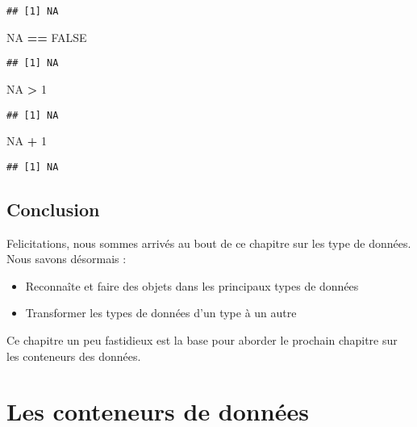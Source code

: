 \documentclass[]{book}
\newenvironment{Shaded}{\begin{snugshade}}{\end{snugshade}}
\newcommand{\DecValTok}[1]{\textcolor[rgb]{0.00,0.00,0.81}{#1}}
\newcommand{\StringTok}[1]{\textcolor[rgb]{0.31,0.60,0.02}{#1}}
\newcommand{\OtherTok}[1]{\textcolor[rgb]{0.56,0.35,0.01}{#1}}
\newcommand{\OperatorTok}[1]{\textcolor[rgb]{0.81,0.36,0.00}{\textbf{#1}}}
\providecommand{\tightlist}{%
  \setlength{\itemsep}{0pt}\setlength{\parskip}{0pt}}
\theoremstyle{definition}
\theoremstyle{definition}
\theoremstyle{definition}
\theoremstyle{remark}
\begin{document}
\begin{verbatim}
## [1] NA
\end{verbatim}

\begin{Shaded}
\begin{Highlighting}[]
\OtherTok{NA} \OperatorTok{==}\StringTok{ }\OtherTok{FALSE}
\end{Highlighting}
\end{Shaded}

\begin{verbatim}
## [1] NA
\end{verbatim}

\begin{Shaded}
\begin{Highlighting}[]
\OtherTok{NA} \OperatorTok{>}\StringTok{ }\DecValTok{1}
\end{Highlighting}
\end{Shaded}

\begin{verbatim}
## [1] NA
\end{verbatim}

\begin{Shaded}
\begin{Highlighting}[]
\OtherTok{NA} \OperatorTok{+}\StringTok{ }\DecValTok{1}
\end{Highlighting}
\end{Shaded}

\begin{verbatim}
## [1] NA
\end{verbatim}

\section{Conclusion}\label{conclusion-2}

Felicitations, nous sommes arrivés au bout de ce chapitre sur les type
de données. Nous savons désormais :

\begin{itemize}
\tightlist
\item
  Reconnaîte et faire des objets dans les principaux types de données
\item
  Transformer les types de données d'un type à un autre
\end{itemize}

Ce chapitre un peu fastidieux est la base pour aborder le prochain
chapitre sur les conteneurs des données.

\chapter{Les conteneurs de données}\label{dataType2}
\end{document}
